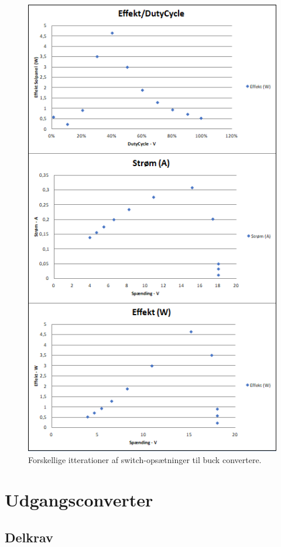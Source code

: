 \documentclass[../main.tex]{subfiles}
\begin{document}
            \begin{figure}[H]
            \includegraphics[scale = 0.8]{Dokumentation/Figures/PV_buckHardwareTest.png}
            \caption{Forskellige itterationer af switch-opsætninger til buck convertere.}
            \label{fig: Testresultater MPPT-Buckconverter}
            \end{figure}
                    
\section{Udgangsconverter}
        
    \subsection{Delkrav}
        
\end{document}
